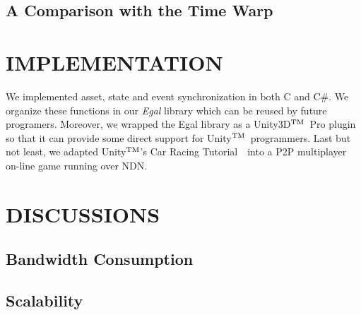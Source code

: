 \documentclass{sigchi}
\begin{document}
\subsection{A Comparison with the Time Warp}






\section{IMPLEMENTATION}
\label{implementation}
\def\tm{\leavevmode\hbox{$\rm {}^{TM}$}} %

We implemented asset, state and event synchronization in both C and C\#. We organize these functions in our \emph{Egal} library which can be reused by future programers. Moreover, we wrapped the Egal library as a Unity3D\tm~Pro plugin so that it can provide some direct support for Unity\tm~programmers. Last but not least, we adapted Unity\tm's Car Racing Tutorial~\cite{UnityCar}~into a P2P multiplayer on-line game running over NDN.





\section{DISCUSSIONS}
\label{discussions}

\subsection{Bandwidth Consumption}

\subsection{Scalability}

\end{document}

